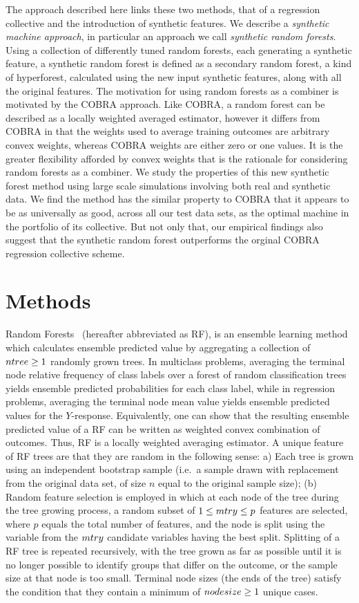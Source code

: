 \documentclass{bmcart}
\def\mtry{{\sl mtry }}
\def\ntree{{\sl ntree }}
\def\nodesize{{\sl nodesize }}
\begin{document}
The approach described here links these two methods, that of a
regression collective and the introduction of synthetic features.  We
describe a {\it synthetic machine approach}, in particular an approach
we call {\it synthetic random forests}.  Using a collection of
differently tuned random forests, each generating a synthetic feature,
a synthetic random forest is defined as a secondary random forest, a
kind of hyperforest, calculated using the new input synthetic
features, along with all the original features.  The motivation for
using random forests as a combiner is motivated by the COBRA approach.
Like COBRA, a random forest can be described as a locally weighted
averaged estimator, however it differs from COBRA in that the weights
used to average training outcomes are arbitrary convex weights,
whereas COBRA weights are either zero or one values. It is the greater
flexibility afforded by convex weights that is the rationale for
considering random forests as a combiner.  We study the properties of
this new synthetic forest method using large scale simulations
involving both real and synthetic data. We find the method has the
similar property to COBRA that it appears to be as universally as
good, across all our test data sets, as the optimal machine in the
portfolio of its collective.  But not only that, our empirical
findings also suggest that the synthetic random forest outperforms the
orginal COBRA regression collective scheme.

\section*{Methods}

Random Forests~\cite{breiman:2001} (hereafter abbreviated as RF), is
an ensemble learning method which calculates ensemble predicted value
by aggregating a collection of $\ntree\ge 1$ randomly grown trees.  In
multiclass problems, averaging the terminal node relative frequency of
class labels over a forest of random classification trees yields
ensemble predicted probabilities for each class label, while in
regression problems, averaging the terminal node mean value yields
ensemble predicted values for the $Y$-response.  Equivalently, one can
show that the resulting ensemble predicted value of a RF can be
written as weighted convex combination of outcomes.  Thus, RF is a
locally weighted averaging estimator.  A unique feature of RF trees are
that they are random in the following sense: a) Each tree is grown
using an independent bootstrap sample (i.e.\ a sample drawn with
replacement from the original data set, of size $n$ equal to the
original sample size); (b) Random feature selection is employed in
which at each node of the tree during the tree growing process, a
random subset of $1\le \mtry\le p$ features are selected, where $p$
equals the total number of features, and the node is split using the
variable from the $\mtry$ candidate variables having the best split.
Splitting of a RF tree is repeated recursively, with the tree grown as
far as possible until it is no longer possible to identify groups that
differ on the outcome, or the sample size at that node is too small.
Terminal node sizes (the ends of the tree) satisfy the condition that
they contain a minimum of $\nodesize\ge 1$ unique cases.
\end{document}
